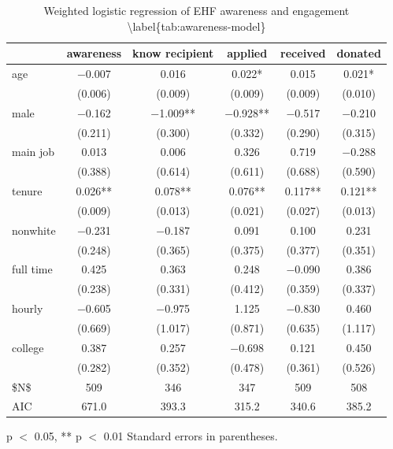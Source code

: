 \documentclass[
  11pt,
  oneside]{article}
\begin{document}
\begin{table}
\centering
\caption{\label{tab:awareness-model}Weighted logistic regression of EHF awareness and engagement \textbackslash{}label\{tab:awareness-model\}}
\centering
\begin{threeparttable}
\begin{tabular}[t]{lccccc}
\toprule
  & awareness & know recipient & applied & received & donated\\
\midrule
age & \num{-0.007} & \num{0.016} & \num{0.022}* & \num{0.015} & \num{0.021}*\\
 & (\num{0.006}) & (\num{0.009}) & (\num{0.009}) & (\num{0.009}) & (\num{0.010})\\
male & \num{-0.162} & \num{-1.009}** & \num{-0.928}** & \num{-0.517} & \num{-0.210}\\
 & (\num{0.211}) & (\num{0.300}) & (\num{0.332}) & (\num{0.290}) & (\num{0.315})\\
main job & \num{0.013} & \num{0.006} & \num{0.326} & \num{0.719} & \num{-0.288}\\
 & (\num{0.388}) & (\num{0.614}) & (\num{0.611}) & (\num{0.688}) & (\num{0.590})\\
tenure & \num{0.026}** & \num{0.078}** & \num{0.076}** & \num{0.117}** & \num{0.121}**\\
 & (\num{0.009}) & (\num{0.013}) & (\num{0.021}) & (\num{0.027}) & (\num{0.013})\\
nonwhite & \num{-0.231} & \num{-0.187} & \num{0.091} & \num{0.100} & \num{0.231}\\
 & (\num{0.248}) & (\num{0.365}) & (\num{0.375}) & (\num{0.377}) & (\num{0.351})\\
full time & \num{0.425} & \num{0.363} & \num{0.248} & \num{-0.090} & \num{0.386}\\
 & (\num{0.238}) & (\num{0.331}) & (\num{0.412}) & (\num{0.359}) & (\num{0.337})\\
hourly & \num{-0.605} & \num{-0.975} & \num{1.125} & \num{-0.830} & \num{0.460}\\
 & (\num{0.669}) & (\num{1.017}) & (\num{0.871}) & (\num{0.635}) & (\num{1.117})\\
college & \num{0.387} & \num{0.257} & \num{-0.698} & \num{0.121} & \num{0.450}\\
 & (\num{0.282}) & (\num{0.352}) & (\num{0.478}) & (\num{0.361}) & (\num{0.526})\\
\midrule
\$N\$ & \num{509} & \num{346} & \num{347} & \num{509} & \num{508}\\
AIC & \num{671.0} & \num{393.3} & \num{315.2} & \num{340.6} & \num{385.2}\\
\bottomrule
\end{tabular}
\begin{tablenotes}
\item * p $<$ 0.05, ** p $<$ 0.01 Standard errors in parentheses.
\end{tablenotes}
\end{threeparttable}
\end{table}
\end{document}
